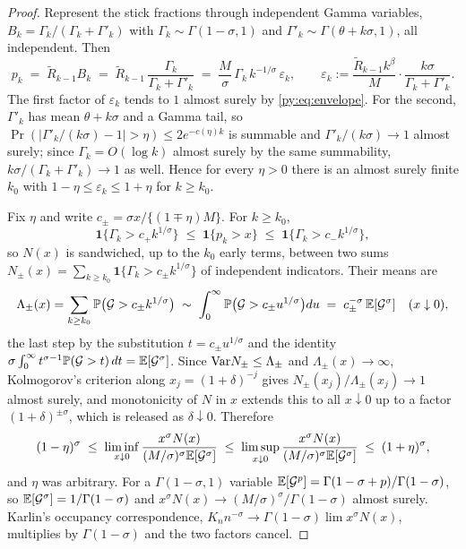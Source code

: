 \begin{proof}
Represent the stick fractions through independent Gamma variables,
$B_k = \Gamma_k/(\Gamma_k+\Gamma'_k)$ with $\Gamma_k \sim \Gamma(1-\sigma,1)$ and
$\Gamma'_k \sim \Gamma(\theta+k\sigma,1)$, all independent. Then
\[
p_k \;=\; \widetilde R_{k-1}B_k
\;=\; \widetilde R_{k-1}\,\frac{\Gamma_k}{\Gamma_k+\Gamma'_k}
\;=\; \frac{M}{\sigma}\,\Gamma_k\,k^{-1/\sigma}\,\varepsilon_k,
\qquad
\varepsilon_k := \frac{\widetilde R_{k-1}k^{\beta}}{M}\cdot\frac{k\sigma}{\Gamma_k+\Gamma'_k}.
\]
The first factor of $\varepsilon_k$ tends to $1$ almost surely by \eqref{py:eq:envelope}. For the
second, $\Gamma'_k$ has mean $\theta+k\sigma$ and a Gamma tail, so
$\Pr(|\Gamma'_k/(k\sigma) - 1| > \eta) \le 2e^{-c(\eta)k}$ is summable and
$\Gamma'_k/(k\sigma) \to 1$ almost surely; since $\Gamma_k = O(\log k)$ almost surely by the same
summability, $k\sigma/(\Gamma_k+\Gamma'_k) \to 1$ as well. Hence for every $\eta > 0$ there is an
almost surely finite $k_0$ with $1-\eta \le \varepsilon_k \le 1+\eta$ for $k \ge k_0$.

Fix $\eta$ and write $c_\pm = \sigma x/\{(1\mp\eta)M\}$. For $k \ge k_0$,
\[
\mathbf{1}\{\Gamma_k > c_+k^{1/\sigma}\} \;\le\; \mathbf{1}\{p_k > x\} \;\le\;
\mathbf{1}\{\Gamma_k > c_-k^{1/\sigma}\},
\]
so $N(x)$ is sandwiched, up to the $k_0$ early terms, between two sums
$N_\pm(x) = \sum_{k \ge k_0}\mathbf{1}\{\Gamma_k > c_\pm k^{1/\sigma}\}$ of independent indicators.
Their means are
\[
\Lambda_\pm(x) = \sum_{k\ge k_0}\mathbb{P}\big(\mathcal{G} > c_\pm k^{1/\sigma}\big)
\;\sim\; \int_0^\infty \mathbb{P}\big(\mathcal{G} > c_\pm u^{1/\sigma}\big)du
\;=\; c_\pm^{-\sigma}\,\mathbb{E}[\mathcal{G}^{\sigma}]
\quad (x \downarrow 0),
\]
the last step by the substitution $t = c_\pm u^{1/\sigma}$ and the identity
$\sigma\int_0^\infty t^{\sigma-1}\mathbb{P}(\mathcal{G}>t)\,dt = \mathbb{E}[\mathcal{G}^{\sigma}]$. Since
$\mathrm{Var} N_\pm \le \Lambda_\pm$ and $\Lambda_\pm(x) \to \infty$, Kolmogorov's criterion along
$x_j = (1+\delta)^{-j}$ gives $N_\pm(x_j)/\Lambda_\pm(x_j) \to 1$ almost surely, and monotonicity of $N$ in
$x$ extends this to all $x \downarrow 0$ up to a factor $(1+\delta)^{\pm\sigma}$, which is released as $\delta \downarrow 0$. Therefore
\[
(1-\eta)^{\sigma} \;\le\; \liminf_{x\downarrow0}\frac{x^{\sigma}N(x)}{(M/\sigma)^{\sigma}\mathbb{E}[\mathcal{G}^{\sigma}]}
\;\le\; \limsup_{x\downarrow0}\frac{x^{\sigma}N(x)}{(M/\sigma)^{\sigma}\mathbb{E}[\mathcal{G}^{\sigma}]}
\;\le\; (1+\eta)^{\sigma},
\]
and $\eta$ was arbitrary. For a $\Gamma(1-\sigma,1)$ variable
$\mathbb{E}[\mathcal{G}^{p}] = \Gamma(1-\sigma+p)/\Gamma(1-\sigma)$, so $\mathbb{E}[\mathcal{G}^{\sigma}] =
1/\Gamma(1-\sigma)$ and $x^{\sigma}N(x) \to (M/\sigma)^{\sigma}/\Gamma(1-\sigma)$ almost surely.
Karlin's occupancy correspondence, $K_n n^{-\sigma} \to \Gamma(1-\sigma)\lim x^{\sigma}N(x)$,
multiplies by $\Gamma(1-\sigma)$ and the two factors cancel.
\end{proof}

